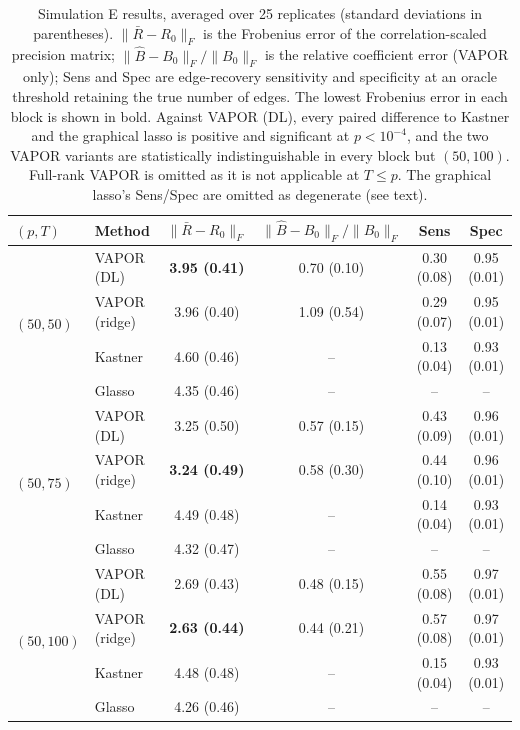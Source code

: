 \begin{table}[t]
\centering
\caption{Simulation E results, averaged over 25 replicates (standard deviations in parentheses). $\|\bar R-R_0\|_F$ is the Frobenius error of the correlation-scaled precision matrix; $\|\hat B-B_0\|_F/\|B_0\|_F$ is the relative coefficient error (VAPOR only); Sens and Spec are edge-recovery sensitivity and specificity at an oracle threshold retaining the true number of edges. The lowest Frobenius error in each block is shown in bold. Against VAPOR (DL), every paired difference to Kastner and the graphical lasso is positive and significant at $p<10^{-4}$, and the two VAPOR variants are statistically indistinguishable in every block but $(50,100)$. Full-rank VAPOR is omitted as it is not applicable at $T\le p$. The graphical lasso's Sens/Spec are omitted as degenerate (see text).}
\label{tab:sim-e}
\small
\begin{tabular}{llcccc}
\toprule
$(p,T)$ & Method & $\|\bar R-R_0\|_F$ & $\|\hat B-B_0\|_F/\|B_0\|_F$ & Sens & Spec \\
\midrule
\multirow{4}{*}{$(50,50)$}
  & VAPOR (DL)    & \textbf{3.95 (0.41)} & 0.70 (0.10) & 0.30 (0.08) & 0.95 (0.01)\\
  & VAPOR (ridge) & 3.96 (0.40) & 1.09 (0.54) & 0.29 (0.07) & 0.95 (0.01)\\
  & Kastner       & 4.60 (0.46) & --          & 0.13 (0.04) & 0.93 (0.01)\\
  & Glasso        & 4.35 (0.46) & --          & --          & --\\
\midrule
\multirow{4}{*}{$(50,75)$}
  & VAPOR (DL)    & 3.25 (0.50) & 0.57 (0.15) & 0.43 (0.09) & 0.96 (0.01)\\
  & VAPOR (ridge) & \textbf{3.24 (0.49)} & 0.58 (0.30) & 0.44 (0.10) & 0.96 (0.01)\\
  & Kastner       & 4.49 (0.48) & --          & 0.14 (0.04) & 0.93 (0.01)\\
  & Glasso        & 4.32 (0.47) & --          & --          & --\\
\midrule
\multirow{4}{*}{$(50,100)$}
  & VAPOR (DL)    & 2.69 (0.43) & 0.48 (0.15) & 0.55 (0.08) & 0.97 (0.01)\\
  & VAPOR (ridge) & \textbf{2.63 (0.44)} & 0.44 (0.21) & 0.57 (0.08) & 0.97 (0.01)\\
  & Kastner       & 4.48 (0.48) & --          & 0.15 (0.04) & 0.93 (0.01)\\
  & Glasso        & 4.26 (0.46) & --          & --          & --\\

\end{tabular}
\end{table}
